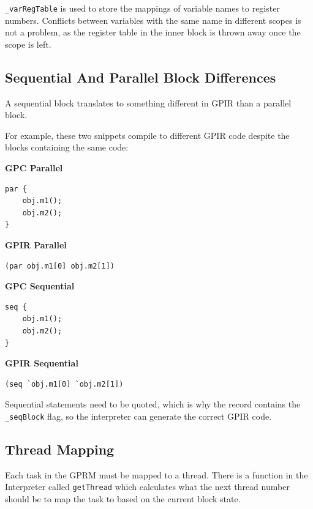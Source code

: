\texttt{\_varRegTable} is used to store the mappings of variable names to register numbers. 
Conflicts between variables with the same name in different scopes is not a problem,
as the register table in the inner block is thrown away once the scope is left.

\subsection{Sequential And Parallel Block Differences}
A sequential block translates to something different in GPIR than a parallel block.

For example, these two snippets compile to different GPIR code despite
the blocks containing the same code:\\


\begin{minipage}{.48\textwidth}
\center \textbf{GPC Parallel}
\begin{lstlisting}[style=myGPC, frame=single]
par {
    obj.m1();
    obj.m2();
}
\end{lstlisting}

\center \textbf{GPIR Parallel}
\begin{lstlisting}[style=myGPIR, frame=single]
(par obj.m1[0] obj.m2[1])
\end{lstlisting}
\end{minipage}
\hfill
%
%
\begin{minipage}{.48\textwidth}
\center \textbf{GPC Sequential}
\begin{lstlisting}[style=myGPC, frame=single]
seq {
    obj.m1();
    obj.m2();
}
\end{lstlisting}

\center \textbf{GPIR Sequential}
\begin{lstlisting}[style=myGPIR, frame=single]
(seq `obj.m1[0] `obj.m2[1])
\end{lstlisting}
\end{minipage}
 
Sequential statements need to be quoted, which is why the record contains
the \texttt{\_seqBlock} flag, so the interpreter can generate the correct GPIR code.

\subsection{Thread Mapping}
Each task in the GPRM must be mapped to a thread. There is a function
in the Interpreter called \texttt{getThread} which calculates what the next thread 
number should be to map the task to based on the current block state.

